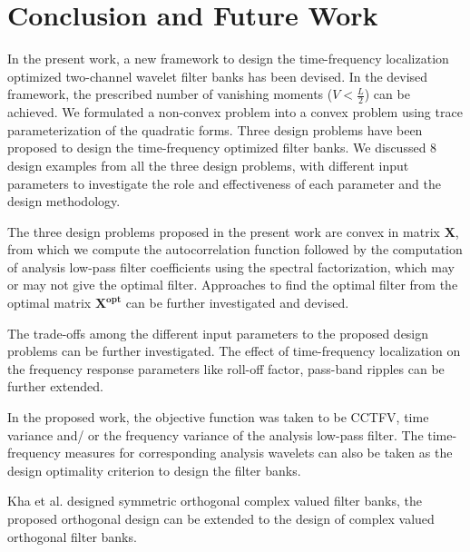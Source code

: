 \chapter{Conclusion and Future Work}
In the present work, a new framework to design the time-frequency localization optimized two-channel wavelet filter banks has been devised. In the devised framework, the prescribed number of vanishing moments ($V < \frac{L}{2}$) can be achieved. We formulated a non-convex problem into a convex problem using trace parameterization of the quadratic forms. Three design problems have been proposed to design the time-frequency optimized filter banks. We discussed 8 design examples from all the three design problems, with different input parameters to investigate the role and effectiveness of each parameter and the design methodology. 

The three design problems proposed in the present work are convex in matrix $\mathbf{X}$, from which we compute the autocorrelation function followed by the computation of analysis low-pass filter coefficients using the spectral factorization, which may or may not give the optimal filter. Approaches to find the optimal filter from the optimal matrix $\mathbf{X^{opt}}$ can be further investigated and devised.

The trade-offs among the different input parameters to the proposed design problems can be further investigated.
The effect of time-frequency localization on the frequency response parameters like roll-off factor, pass-band ripples can be further extended.

In the proposed work, the objective function was taken to be CCTFV, time variance and/ or the frequency variance of the analysis low-pass filter. The time-frequency measures for corresponding analysis wavelets can also be taken as the design optimality criterion to design the filter banks. 

Kha \cite{Kha} et al. designed symmetric orthogonal complex valued filter banks, the proposed orthogonal design can be extended to the design of complex valued orthogonal filter banks.
